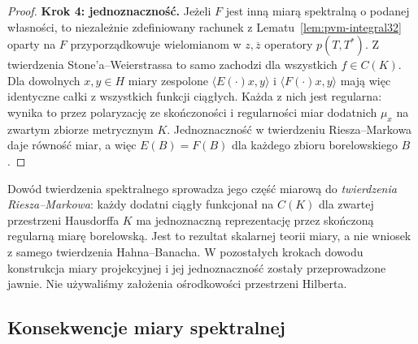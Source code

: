 \begin{proof}
\textbf{Krok 4: jednoznaczność.}
Jeżeli $F$ jest inną miarą spektralną o podanej własności,
to niezależnie zdefiniowany rachunek z
Lematu~\ref{lem:pvm-integral32} oparty na $F$
przyporządkowuje wielomianom
w $z,\overline z$ operatory $p(T,T^*)$.
Z twierdzenia Stone'a--Weierstrassa to samo zachodzi
dla wszystkich $f\in C(K)$. Dla dowolnych $x,y\in H$
miary zespolone $\langle E(\cdot)x,y\rangle$ i
$\langle F(\cdot)x,y\rangle$ mają więc identyczne całki
z wszystkich funkcji ciągłych. Każda z nich jest regularna:
wynika to przez polaryzację ze skończoności i regularności
miar dodatnich $\mu_x$ na zwartym zbiorze metrycznym $K$.
Jednoznaczność w twierdzeniu Riesza--Markowa daje
równość miar, a więc $E(B)=F(B)$ dla każdego zbioru
borelowskiego $B$.
\end{proof}

\begin{uwaga}
Dowód twierdzenia spektralnego sprowadza jego część miarową
do \emph{twierdzenia Riesza--Markowa}: każdy dodatni ciągły
funkcjonał na $C(K)$ dla zwartej przestrzeni Hausdorffa $K$
ma jednoznaczną reprezentację przez skończoną regularną miarę
borelowską. Jest to rezultat skalarnej teorii miary, a nie
wniosek z samego twierdzenia Hahna--Banacha. W pozostałych
krokach dowodu konstrukcja miary projekcyjnej i jej jednoznaczność
zostały przeprowadzone jawnie. Nie używaliśmy założenia
ośrodkowości przestrzeni Hilberta.
\end{uwaga}

\subsection{Konsekwencje miary spektralnej}

